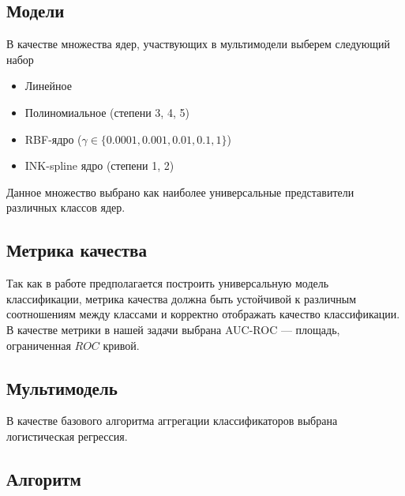 \documentclass[12pt,twoside]{article}
\begin{document}
\subsection{Модели}

В качестве множества ядер, участвующих в мультимодели выберем следующий набор

\begin{itemize}
    \item Линейное
    \item Полиномиальное (степени 3, 4, 5)
    \item RBF-ядро ($\gamma \in \{0.0001, 0.001, 0.01, 0.1, 1\}$)
    \item INK-spline ядро (степени 1, 2)
\end{itemize}

Данное множество выбрано как наиболее универсальные представители различных классов ядер. 

\subsection{Метрика качества}

Так как в работе предполагается построить универсальную модель классификации, метрика качества должна быть устойчивой к различным соотношениям между классами и корректно отображать качество классификации. В качестве метрики в нашей задачи выбрана AUC-ROC --- площадь, ограниченная $ROC$ кривой.

\subsection{Мультимодель}

В качестве базового алгоритма аггрегации классификаторов выбрана логистическая регрессия.

\newpage

\subsection{Алгоритм}
\end{document}
